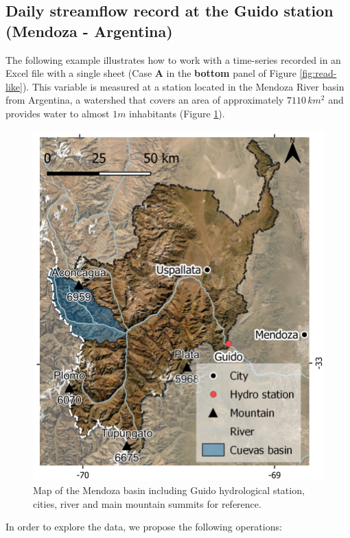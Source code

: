 \hypertarget{daily-streamflow-record-at-the-guido-station-mendoza---argentina}{%
\subsection{Daily streamflow record at the Guido station (Mendoza - Argentina)}\label{daily-streamflow-record-at-the-guido-station-mendoza---argentina}}

The following example illustrates how to work with a time-series
recorded in an Excel file with a single sheet (Case \textbf{A} in the
\textbf{bottom} panel of Figure \ref{fig:read-like}). This variable is
measured at a station located in the Mendoza River basin from Argentina,
a watershed that covers an area of approximately \(7110 \, km^2\) and
provides water to almost \(1m\) inhabitants (Figure \ref{fig:mza-basin}).

\begin{figure}[h]

{\centering \includegraphics[width=0.6\linewidth]{./mza_basin} 

}

\caption{Map of the Mendoza basin including Guido hydrological station, cities, river and main mountain summits for reference.}\label{fig:mza-basin}
\end{figure}

In order to explore the data, we propose the following operations:

